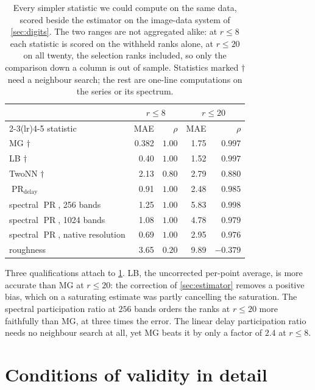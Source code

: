 \documentclass{article}
\DeclareMathOperator{\PR}{PR}
\begin{document}
\begin{table}[H]
\centering
\caption{Every simpler statistic we could compute on the same data, scored beside the estimator
on the image-data system of \cref{sec:digits}. The two ranges are not aggregated
alike: at $r \le 8$ each statistic is scored on the withheld ranks alone, at $r \le 20$ on all
twenty, the selection ranks included, so only the comparison down a column is out of sample. Statistics marked $\dagger$ need a
neighbour search; the rest are one-line computations on the series or its spectrum.}
\label{tab:alts}
\begin{tabular}{lrrrr}
\toprule
 & \multicolumn{2}{c}{$r \le 8$} & \multicolumn{2}{c}{$r \le 20$} \\
\cmidrule(lr){2-3}\cmidrule(lr){4-5}
statistic & MAE & $\rho$ & MAE & $\rho$ \\
\midrule
MG $\dagger$                      & 0.382 & $1.00$ & 1.75 & $0.997$ \\
LB $\dagger$                      & 0.40  & $1.00$ & 1.52 & $0.997$ \\
TwoNN $\dagger$                   & 2.13  & $0.80$ & 2.79 & $0.880$ \\
$\PR_{\mathrm{delay}}$                & 0.91  & $1.00$ & 2.48 & $0.985$ \\
spectral $\PR$, 256 bands          & 1.25  & $1.00$ & 5.83 & $0.998$ \\
spectral $\PR$, 1024 bands         & 1.08  & $1.00$ & 4.78 & $0.979$ \\
spectral $\PR$, native resolution  & 0.69  & $1.00$ & 2.95 & $0.976$ \\
roughness                         & 3.65  & $0.20$ & 9.89 & $-0.379$ \\
\bottomrule
\end{tabular}
\end{table}

Three qualifications attach to \cref{tab:alts}. LB, the uncorrected per-point average, is more
accurate than MG at $r \le 20$: the correction of \cref{sec:estimator} removes a positive bias,
which on a saturating estimate was partly cancelling the saturation. The spectral participation
ratio at $256$ bands orders the ranks at $r \le 20$ more faithfully than MG, at three times the
error. The linear delay participation ratio needs no neighbour search at all, yet MG beats it by only
a factor of $2.4$ at $r \le 8$.

\section{Conditions of validity in detail}\label{app:validity}
\end{document}

